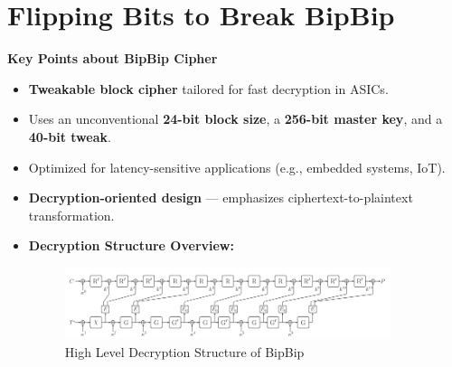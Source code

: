 \documentclass{beamer}
\newenvironment{tres important}[2][]{
	\setkeys{EmphEqEnv}{#2}
	\setkeys{EmphEqOpt}{box={\setlength{\fboxsep}{10pt}\fcolorbox{myNewColorA}{white}},#1}
	\EmphEqMainEnv}
{\endEmphEqMainEnv}
\begin{document}
\section{Flipping Bits to Break BipBip}
\begin{frame}[fragile]
    \textbf{Key Points about BipBip Cipher}
    \begin{itemize}
        \item \textbf{Tweakable block cipher} tailored for fast decryption in ASICs.
        \item Uses an unconventional \textbf{24-bit block size}, a \textbf{256-bit master key}, and a \textbf{40-bit tweak}.
        \item Optimized for latency-sensitive applications (e.g., embedded systems, IoT).
        \item \textbf{Decryption-oriented design} — emphasizes ciphertext-to-plaintext transformation.
        \item \textbf{Decryption Structure Overview:}
        \begin{figure}[h]
          \centering
          \includegraphics[width=0.9\textwidth]{images/bipbip.png}
          \caption{High Level Decryption Structure of BipBip}
          \label{fig:bipbip_decrypt_structure}
        \end{figure}
        \end{itemize}
\end{frame}
\end{document}
